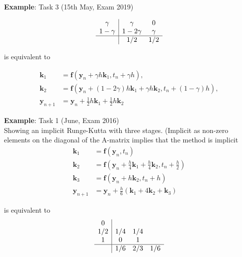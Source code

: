 \textbf{Example}: Task 3 (15th May, Exam 2019)

\begin{equation}
\begin{array}{c|cc}
\gamma & \gamma & 0 \\
1-\gamma & 1-2 \gamma & \gamma \\
\hline & 1 / 2 & 1 / 2
\end{array}
\end{equation}

is equivalent to

\begin{equation}
    \begin{aligned}
        \mathbf{k}_{1} &=\mathbf{f}\left(\mathbf{y}_{n}+\gamma h \mathbf{k}_{1}, t_{n}+\gamma h\right), \\
        \mathbf{k}_{2} &=\mathbf{f}\left(\mathbf{y}_{n}+(1-2 \gamma) h \mathbf{k}_{1}+\gamma h \mathbf{k}_{2}, t_{n}+(1-\gamma) h\right), \\
        \mathbf{y}_{n+1} &=\mathbf{y}_{n}+\frac{1}{2} h \mathbf{k}_{1}+\frac{1}{2} h \mathbf{k}_{2}
    \end{aligned}
\end{equation}

\textbf{Example}: Task 1 (June, Exam 2016) \\
Showing an implicit Runge-Kutta with three stages. (Implicit as non-zero elements on the diagonal of the A-matrix implies that the method is implicit
\begin{equation}
    \begin{aligned}
        \mathbf{k}_{1} &=\mathbf{f}\left(\mathbf{y}_{n}, t_{n}\right) \\
        \mathbf{k}_{2} &=\mathbf{f}\left(\mathbf{y}_{n}+\frac{h}{4} \mathbf{k}_{1}+\frac{h}{4} \mathbf{k}_{2}, t_{n}+\frac{h}{2}\right) \\
        \mathbf{k}_{3} &=\mathbf{f}\left(\mathbf{y}_{n}+h \mathbf{k}_{2}, t_{n}+h\right) \\
        \mathbf{y}_{n+1} &=\mathbf{y}_{n}+\frac{h}{6}\left(\mathbf{k}_{1}+4 \mathbf{k}_{2}+\mathbf{k}_{3}\right)
    \end{aligned}
\end{equation}

is equivalent to \\

\begin{equation}
    \begin{array}{c|ccc}
        0 & & & \\
        1 / 2 & 1 / 4 & 1 / 4 & \\
        1 & 0 & 1 & \\
        \hline & 1 / 6 & 2 / 3 & 1 / 6
    \end{array}
\end{equation}

